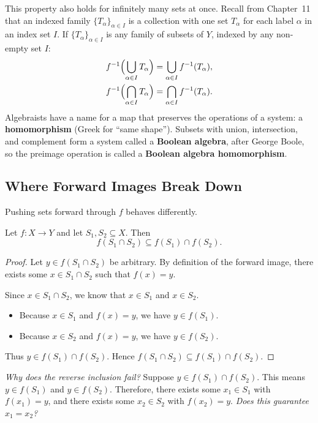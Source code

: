 This property also holds for infinitely many sets at once. Recall from Chapter~11 that an indexed family $\{T_\alpha\}_{\alpha \in I}$ is a collection with one set $T_\alpha$ for each label $\alpha$ in an index set $I$. If $\{T_\alpha\}_{\alpha \in I}$ is any family of subsets of $Y$, indexed by any non-empty set $I$:
\[
\begin{aligned}
f^{-1}\Bigl(\bigcup_{\alpha \in I} T_\alpha\Bigr) &= \bigcup_{\alpha \in I} f^{-1}(T_\alpha), \\
f^{-1}\Bigl(\bigcap_{\alpha \in I} T_\alpha\Bigr) &= \bigcap_{\alpha \in I} f^{-1}(T_\alpha).
\end{aligned}
\]
Algebraists have a name for a map that preserves the operations of a system: a \textbf{homomorphism} (Greek for ``same shape''). Subsets with union, intersection, and complement form a system called a \textbf{Boolean algebra}, after George Boole, so the preimage operation is called a \textbf{Boolean algebra homomorphism}.

\subsection{Where Forward Images Break Down}

Pushing sets forward through $f$ behaves differently.

\begin{theorem}
Let $f: X \to Y$ and let $S_1, S_2 \subseteq X$. Then
\[
f(S_1 \cap S_2) \subseteq f(S_1) \cap f(S_2).
\]
\end{theorem}

\begin{proof}
Let $y \in f(S_1 \cap S_2)$ be arbitrary. By definition of the forward image, there exists some $x \in S_1 \cap S_2$ such that $f(x) = y$.

Since $x \in S_1 \cap S_2$, we know that $x \in S_1$ and $x \in S_2$.
\begin{itemize}
\item Because $x \in S_1$ and $f(x) = y$, we have $y \in f(S_1)$.
\item Because $x \in S_2$ and $f(x) = y$, we have $y \in f(S_2)$.
\end{itemize}
Thus $y \in f(S_1) \cap f(S_2)$. Hence $f(S_1 \cap S_2) \subseteq f(S_1) \cap f(S_2)$.
\end{proof}

\emph{Why does the reverse inclusion fail?} 
Suppose $y \in f(S_1) \cap f(S_2)$. This means $y \in f(S_1)$ and $y \in f(S_2)$.
Therefore, there exists some $x_1 \in S_1$ with $f(x_1) = y$, and there exists some $x_2 \in S_2$ with $f(x_2) = y$.
\emph{Does this guarantee $x_1 = x_2$?}

